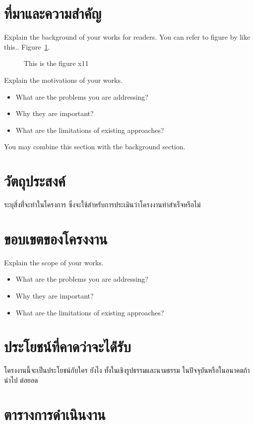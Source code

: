 \documentclass[12pt,oneside,openright,a4paper]{cpe-thai-project}
\begin{document}
\section{ที่มาและความสำคัญ}

Explain the background of your works for readers. You can refer to figure by like this.. Figure~\ref{fig:x1}.
\begin{figure}[!h]
\caption{This is the figure x11}\label{fig:x1}
\end{figure}

Explain the motivations of your works.  
\begin{itemize}
\item   What are the problems you are addressing? 
\item  Why they are important?
\item  What are the limitations of existing approaches? 
\end{itemize}
You may combine this section with the background section.



\section{วัตถุประสงค์}

ระบุสิ่งท่ี่จะทำในโครงการ ซึ่งจะใช้สำหรับการประเมินว่าโครงงานทำสำเร็จหรือไม่ 

\section{ขอบเขตของโครงงาน}

Explain the scope of your works. 
\begin{itemize}
\item   What are the problems you are addressing? 
\item  Why they are important?
\item  What are the limitations of existing approaches? 
\end{itemize}

\section{ประโยชน์ที่คาดว่าจะได้่รับ}

โครงงานนี้จะเป็นประโยชน์กับใคร ยังไง ทั้งในเชิงรูปธรรมและนามธรรม ในปัจจุบันหรือในอนาคตถ้านำไป
ต่อยอด

\section{ตารางการดำเนินงาน}
\end{document}

